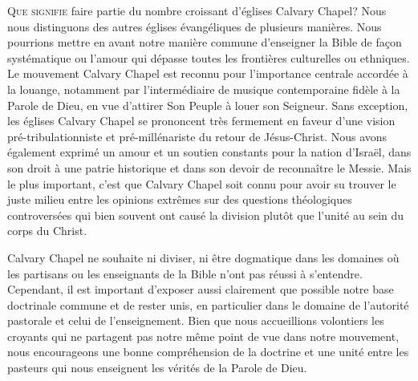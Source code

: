 
\begin{specialpar}{}
\lettrine{Q}{ue signifie} faire partie du nombre \pocketlinebreak
 croissant d'églises Calvary Chapel?
 Nous nous distinguons des autres églises évangéliques de plusieurs manières.
 Nous pourrions mettre en avant notre manière commune d'enseigner la Bible
 de façon systématique ou l'amour qui dépasse toutes les frontières culturelles ou ethniques.
Le mouvement Calvary Chapel est reconnu pour l'importance centrale accordée à la louange,
 notamment par l'intermédiaire de musique con\-tem\-po\-rai\-ne fidèle à la Parole de Dieu,
 en vue d'attirer Son Peuple à louer son Seigneur.
 Sans exception, les églises Calvary Chapel se prononcent très fermement
 en faveur d'une vision pré-tribulationniste et pré-millénariste du retour de Jésus-Christ.
Nous avons également exprimé un amour et un soutien constants pour la nation
 d'Israël,
 dans son droit à une patrie historique  et dans son devoir de reconnaître le Messie.
 Mais le plus important, c'est que Calvary Chapel soit connu pour avoir su trouver
 le juste milieu entre les opinions extrêmes sur des questions théologiques
 controversées qui bien souvent ont causé la division plutôt que l'unité
 au sein du corps du Christ.
\end{specialpar}

Calvary Chapel ne souhaite ni diviser, ni être dogmatique dans les domaines où les partisans
 ou les enseignants de la Bible n'ont pas réussi à s'entendre.
 Cependant, il est important d'exposer aussi clairement que possible notre base doctrinale
 commune et de rester unis, en particulier dans le domaine de l'autorité pastorale
 et celui de l'enseignement. Bien que nous accueillions volontiers les croyants qui
 ne partagent pas notre même point de vue dans notre mouvement,
 nous encourageons une bonne compréhension de la doctrine et une unité entre les pasteurs
 qui nous enseignent les vérités de la Parole de Dieu.

